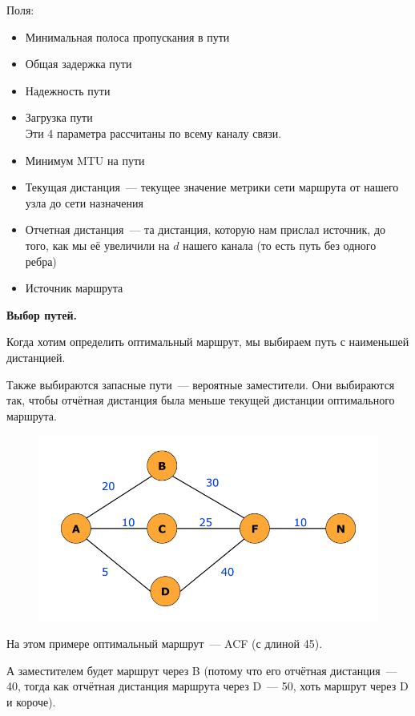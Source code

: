 Поля:
\begin{itemize}
    \item Минимальная полоса пропускания в пути
    \item Общая задержка пути
    \item Надежность пути
    \item Загрузка пути\\
    Эти 4 параметра рассчитаны по всему каналу связи.
    \item Минимум MTU на пути
    \item Текущая дистанция~--- текущее значение метрики сети маршрута от нашего узла до сети назначения
    \item Отчетная дистанция~--- та дистанция, которую нам прислал источник, до того, как мы её увеличили на $d$ нашего канала (то есть путь без одного ребра)
    \item Источник маршрута
\end{itemize}

{\bf Выбор путей.}

Когда хотим определить оптимальный маршрут, мы выбираем путь с наименьшей дистанцией.

Также выбираются запасные пути~--- вероятные заместители. Они выбираются так, чтобы отчётная дистанция была меньше текущей дистанции оптимального маршрута.

\begin{figure}[H]
  \centering
  \includegraphics[width=15cm]{images/04/09}
\end{figure}

На этом примере оптимальный маршрут~--- ACF (с длиной 45).

А заместителем будет маршрут через B (потому что его отчётная дистанция~--- 40, тогда как отчётная дистанция маршрута через D~--- 50, хоть маршрут через D и короче).

